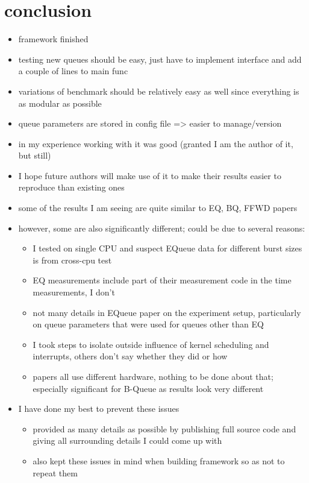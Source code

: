 \section{conclusion}
\begin{itemize}
    \item framework finished
    \item testing new queues should be easy, just have to implement interface and add a couple of lines to main func
    \item variations of benchmark should be relatively easy as well since everything is as modular as possible
    \item queue parameters are stored in config file => easier to manage/version
    \item in my experience working with it was good (granted I am the author of it, but still)
    \item I hope future authors will make use of it to make their results easier to reproduce than existing ones

    \item some of the results I am seeing are quite similar to EQ, BQ, FFWD papers
    \item however, some are also significantly different; could be due to several reasons:
        \begin{itemize}
            \item I tested on single CPU and suspect EQueue data for different burst sizes is from cross-cpu test
            \item EQ measurements include part of their measurement code in the time measurements, I don't
            \item not many details in EQueue paper on the experiment setup, particularly on queue parameters
                that were used for queues other than EQ
            \item I took steps to isolate outside influence of kernel scheduling and interrupts, others don't say whether they did or how
            \item papers all use different hardware, nothing to be done about that; especially significant for B-Queue as results look very different 
        \end{itemize}
    \item I have done my best to prevent these issues
        \begin{itemize}
            \item provided as many details as possible by publishing full source code and giving all surrounding details I could come up with
            \item also kept these issues in mind when building framework so as not to repeat them
        \end{itemize}


\end{itemize}
